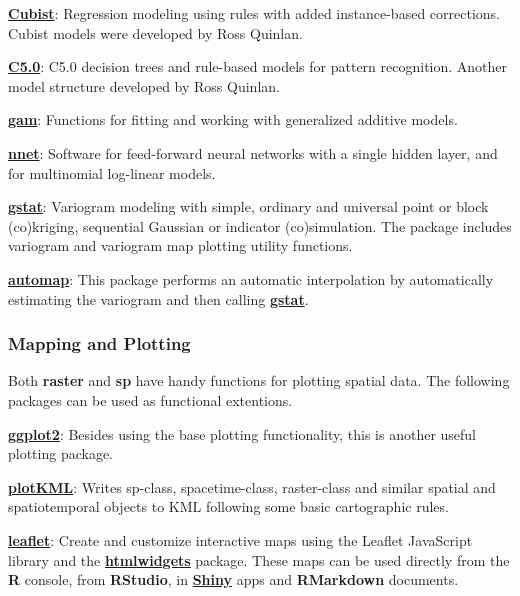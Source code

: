 \documentclass[10pt,b5paper,]{book}
\theoremstyle{definition}
\theoremstyle{definition}
\theoremstyle{definition}
\theoremstyle{remark}
\begin{document}
\href{https://CRAN.R-project.org/package=Cubist}{\textbf{Cubist}}:
Regression modeling using rules with added instance-based corrections.
Cubist models were developed by Ross Quinlan.

\href{https://CRAN.R-project.org/package=C5.0}{\textbf{C5.0}}: C5.0
decision trees and rule-based models for pattern recognition. Another
model structure developed by Ross Quinlan.

\href{https://CRAN.R-project.org/package=gam}{\textbf{gam}}: Functions
for fitting and working with generalized additive models.

\href{https://CRAN.R-project.org/package=nnet}{\textbf{nnet}}: Software
for feed-forward neural networks with a single hidden layer, and for
multinomial log-linear models.

\href{https://CRAN.R-project.org/package=gstat}{\textbf{gstat}}:
Variogram modeling with simple, ordinary and universal point or block
(co)kriging, sequential Gaussian or indicator (co)simulation. The
package includes variogram and variogram map plotting utility functions.

\href{https://CRAN.R-project.org/package=automap}{\textbf{automap}}:
This package performs an automatic interpolation by automatically
estimating the variogram and then calling
\href{https://CRAN.R-project.org/package=gstat}{\textbf{gstat}}.

\hypertarget{mapping-and-plotting}{%
\subsubsection{Mapping and Plotting}\label{mapping-and-plotting}}

Both \textbf{raster} and \textbf{sp} have handy functions for plotting
spatial data. The following packages can be used as functional
extentions.

\href{https://cran.r-project.org/web/packages/ggplot2/index.html}{\textbf{ggplot2}}:
Besides using the base plotting functionality, this is another useful
plotting package.

\href{https://CRAN.R-project.org/package=plotKML}{\textbf{plotKML}}:
Writes sp-class, spacetime-class, raster-class and similar spatial and
spatiotemporal objects to KML following some basic cartographic rules.

\href{https://CRAN.R-project.org/package=leaflet}{\textbf{leaflet}}:
Create and customize interactive maps using the Leaflet JavaScript
library and the
\href{https://cran.r-project.org/web/packages/htmlwidgets/index.html}{\textbf{htmlwidgets}}
package. These maps can be used directly from the \textbf{R} console,
from \textbf{RStudio}, in
\href{https://shiny.rstudio.com/}{\textbf{Shiny}} apps and
\textbf{RMarkdown} documents.
\end{document}
